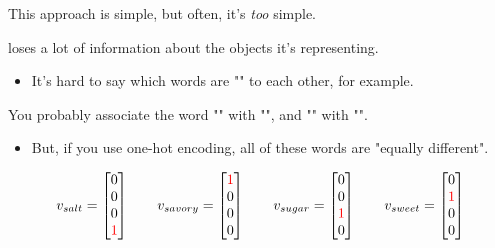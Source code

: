         This approach is simple, but often, it's \textit{too} simple.\\

        \begin{concept}
             loses a lot of information about the objects it's representing.

            \begin{itemize}
                \item It's hard to say which words are "" to each other, for example.
            \end{itemize}
        \end{concept}

        \miniex You probably associate the word "" with "", and "" with "".

        \begin{itemize}
            \item But, if you use one-hot encoding, all of these words are "equally different".
        \end{itemize}

        \begin{equation}
            v_{salt} = 
            \begin{bmatrix}
              0\\0\\0\\ \textcolor{red}{1}
            \end{bmatrix}
            \qquad
            v_{savory} = 
            \begin{bmatrix}
              \textcolor{red}{1}\\0\\0\\0
            \end{bmatrix}
            \qquad
            v_{sugar} = 
            \begin{bmatrix}
              0\\0\\\textcolor{red}{1}\\0
            \end{bmatrix}
            \qquad
            v_{sweet} = 
            \begin{bmatrix}
              0\\\textcolor{red}{1}\\0\\0
            \end{bmatrix}
        \end{equation}

